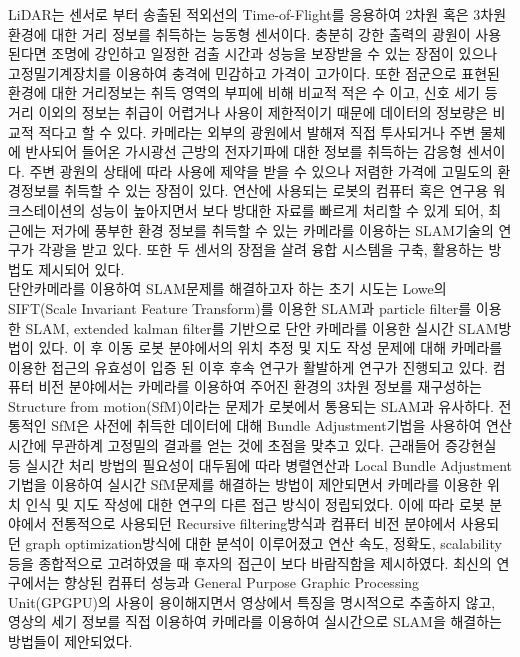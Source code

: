\documentclass[master,korean,final]{cbnu-ecs}
\begin{document}
LiDAR는 센서로 부터 송출된 적외선의 Time-of-Flight를 응용하여 2차원 혹은 3차원 환경에 대한 거리 정보를 취득하는 능동형 센서이다. 충분히 강한 출력의 광원이 사용된다면 조명에 강인하고 일정한 검출 시간과 성능을 보장받을 수 있는 장점이 있으나 고정밀기계장치를 이용하여 충격에 민감하고 가격이 고가이다. 또한 점군으로 표현된 환경에 대한 거리정보는 취득 영역의 부피에 비해 비교적 적은 수 이고, 신호 세기 등 거리 이외의 정보는 취급이 어렵거나 사용이 제한적이기 때문에 데이터의 정보량은 비교적 적다고 할 수 있다. 카메라는 외부의 광원에서 발해져 직접 투사되거나 주변 물체에 반사되어 들어온 가시광선 근방의 전자기파에 대한 정보를 취득하는 감응형 센서이다. 주변 광원의 상태에 따라 사용에 제약을 받을 수 있으나 저렴한 가격에 고밀도의 환경정보를 취득할 수 있는 장점이 있다. 연산에 사용되는 로봇의 컴퓨터 혹은 연구용 워크스테이션의 성능이 높아지면서 보다 방대한 자료를 빠르게 처리할 수 있게 되어, 최근에는 저가에 풍부한 환경 정보를 취득할 수 있는 카메라를 이용하는 SLAM기술의 연구가 각광을 받고 있다. 또한 두 센서의 장점을 살려 융합 시스템을 구축, 활용하는 방법도 제시되어 있다\cite{Newman2006}.\\
단안카메라를 이용하여 SLAM문제를 해결하고자 하는 초기 시도는 Lowe의 SIFT(Scale Invariant Feature Transform)를 이용한 SLAM\cite{Se2005}과 particle filter를 이용한 SLAM\cite{Eade2006}, extended kalman filter를 기반으로 단안 카메라를 이용한 실시간 SLAM방법\cite{Davison2007}이 있다. 이 후 이동 로봇 분야에서의 위치 추정 및 지도 작성 문제에 대해 카메라를 이용한 접근의 유효성이 입증 된 이후 후속 연구가 활발하게 연구가 진행되고 있다. 컴퓨터 비전 분야에서는 카메라를 이용하여 주어진 환경의 3차원 정보를 재구성하는 Structure from motion(SfM)이라는 문제가 로봇에서 통용되는 SLAM과 유사하다. 전통적인 SfM은 사전에 취득한 데이터에 대해 Bundle Adjustment\cite{Triggs2000}기법을 사용하여 연산 시간에 무관하계 고정밀의 결과를 얻는 것에 초점을 맞추고 있다. 근래들어 증강현실 등 실시간 처리 방법의 필요성이 대두됨에 따라 병렬연산과 Local Bundle Adjustment기법을 이용하여 실시간 SfM문제를 해결하는 방법\cite{Klein2007}이 제안되면서 카메라를 이용한 위치 인식 및 지도 작성에 대한 연구의 다른 접근 방식이 정립되었다. 이에 따라 로봇 분야에서 전통적으로 사용되던 Recursive filtering방식과 컴퓨터 비전 분야에서 사용되던 graph optimization방식에 대한 분석\cite{Strasdat2010}이 이루어졌고 연산 속도, 정확도, scalability등을 종합적으로 고려하였을 때 후자의 접근이 보다 바람직함을 제시하였다. 최신의 연구에서는 향상된 컴퓨터 성능과 General Purpose Graphic Processing Unit(GPGPU)의 사용이 용이해지면서 영상에서 특징을 명시적으로 추출하지 않고, 영상의 세기 정보를 직접 이용하여 카메라를 이용하여 실시간으로 SLAM을 해결하는 방법들이 제안되었다\cite{Forster2014b,Engel2014}.\\
\end{document}
